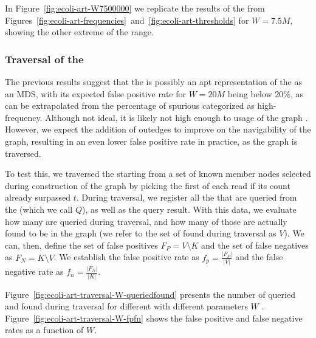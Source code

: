 In Figure~\ref{fig:ecoli-art-W7500000} we replicate the results of the \dBCM from Figures~\ref{fig:ecoli-art-frequencies}~and~\ref{fig:ecoli-art-thresholds} for $W = 7.5M$, showing the other extreme of the range. 

\subsubsection{Traversal of the \dBCM}
\label{sec:results-dbcm-traversal}

The previous results suggest that the \dBCM is possibly an apt representation of the \dBG as an MDS, with its expected false positive rate for $W = 20M$ being below $20\%$, as can be extrapolated from the percentage of spurious  categorized as high-frequency. Although not ideal, it is likely not high enough to  usage of the graph \cite{Pell2012}. However, we expect the addition of outedges to improve on the navigability of the graph, resulting in an even lower false positive rate in practice, as the graph is traversed.

To test this, we traversed the \dBCM starting from a set of known member nodes selected during construction of the graph by picking the first \kmer of each read if its count already surpassed $t$. During traversal, we register all the  that are queried from the \dBCM (which we call $Q$), as well as the query result. With this data, we evaluate how many  are queried during traversal, and how many of those are actually found to be in the graph (we refer to the set of  found during traversal as $V$). We can, then, define the set of false positives $F_P = V \setminus K$ and the set of false negatives as $F_N = K \setminus V$. We establish the false positive rate as $f_p = \frac{|F_P|}{|V|}$ and the false negative rate as $f_n = \frac{|F_N|}{|K|}$.


Figure~\ref{fig:ecoli-art-traversal-W-queriedfound} presents the number of  queried and found during traversal for different \dBCM with different parameters $W$ . Figure~\ref{fig:ecoli-art-traversal-W-fpfn} shows the false positive and false negative rates as a function of $W$.

